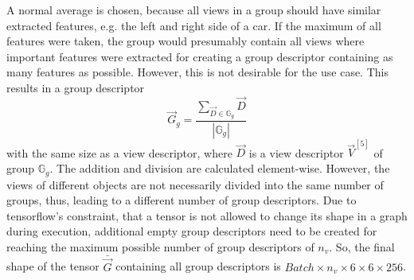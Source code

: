 A normal average is chosen, because all views in a group should have similar extracted features, e.g. the left and right side of a car.
If the maximum of all features were taken, the group would presumably contain all views where important features were extracted for creating a group descriptor containing as many features as possible.
However, this is not desirable for the use case.
This results in a group descriptor
\begin{equation}
	\vec{G}_g = \frac{\sum_{\vec{D} \in \mathbb{G}_g} \vec{D}}{|\mathbb{G}_g|}
\end{equation}
with the same size as a view descriptor, where $\vec{D}$ is a view descriptor $\vec{V}^{[5]}$ of group $\mathbb{G}_g$. The addition and division are calculated element-wise.
However, the views of different objects are not necessarily divided into the same number of groups, thus, leading to a different number of group descriptors.
Due to tensorflow's constraint, that a tensor is not allowed to change its shape in a graph during execution, additional empty group descriptors need to be created for reaching the maximum possible number of group descriptors of $n_v$.
So, the final shape of the tensor $\bar{\vec{G}}$ containing all group descriptors is $Batch \times n_v \times 6 \times 6 \times 256$.

